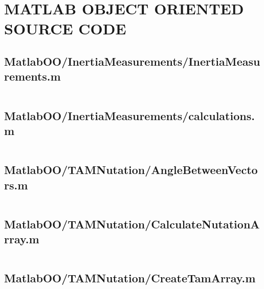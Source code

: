 
\chapter{MATLAB OBJECT ORIENTED SOURCE CODE}
\label{ch:MatlabObjectOrientedSourceCode}

\linespread{1}

\pagebreak
\section*{MatlabOO/InertiaMeasurements/InertiaMeasurements.m}\label{code:MatlabOO/InertiaMeasurements/InertiaMeasurements.m}
\inputminted[linenos,fontsize=\scriptsize]{matlab}{/home/dcouture/git/mathyourlife/TSatPy/beta_versions/matlab_object_oriented/InertiaMeasurements/InertiaMeasurements.m}

\pagebreak
\section*{MatlabOO/InertiaMeasurements/calculations.m}\label{code:MatlabOO/InertiaMeasurements/calculations.m}
\inputminted[linenos,fontsize=\scriptsize]{matlab}{/home/dcouture/git/mathyourlife/TSatPy/beta_versions/matlab_object_oriented/InertiaMeasurements/calculations.m}

\pagebreak
\section*{MatlabOO/TAMNutation/AngleBetweenVectors.m}\label{code:MatlabOO/TAMNutation/AngleBetweenVectors.m}
\inputminted[linenos,fontsize=\scriptsize]{matlab}{/home/dcouture/git/mathyourlife/TSatPy/beta_versions/matlab_object_oriented/TAMNutation/AngleBetweenVectors.m}

\pagebreak
\section*{MatlabOO/TAMNutation/CalculateNutationArray.m}\label{code:MatlabOO/TAMNutation/CalculateNutationArray.m}
\inputminted[linenos,fontsize=\scriptsize]{matlab}{/home/dcouture/git/mathyourlife/TSatPy/beta_versions/matlab_object_oriented/TAMNutation/CalculateNutationArray.m}

\pagebreak
\section*{MatlabOO/TAMNutation/CreateTamArray.m}\label{code:MatlabOO/TAMNutation/CreateTamArray.m}
\inputminted[linenos,fontsize=\scriptsize]{matlab}{/home/dcouture/git/mathyourlife/TSatPy/beta_versions/matlab_object_oriented/TAMNutation/CreateTamArray.m}

